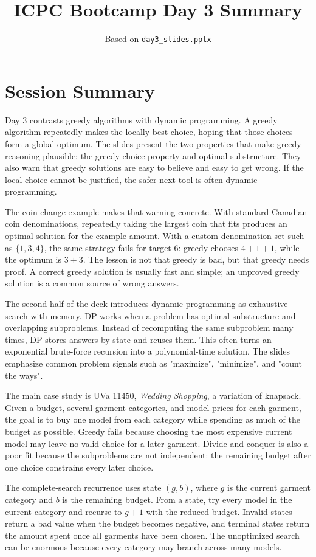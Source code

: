 \documentclass[11pt]{article}
\title{ICPC Bootcamp Day 3 Summary}
\author{Based on \texttt{day3\_slides.pptx}}
\date{}
\begin{document}
\maketitle

\section*{Session Summary}
Day 3 contrasts greedy algorithms with dynamic programming. A greedy algorithm repeatedly makes the locally best choice, hoping that those choices form a global optimum. The slides present the two properties that make greedy reasoning plausible: the greedy-choice property and optimal substructure. They also warn that greedy solutions are easy to believe and easy to get wrong. If the local choice cannot be justified, the safer next tool is often dynamic programming.

The coin change example makes that warning concrete. With standard Canadian coin denominations, repeatedly taking the largest coin that fits produces an optimal solution for the example amount. With a custom denomination set such as \(\{1,3,4\}\), the same strategy fails for target \(6\): greedy chooses \(4+1+1\), while the optimum is \(3+3\). The lesson is not that greedy is bad, but that greedy needs proof. A correct greedy solution is usually fast and simple; an unproved greedy solution is a common source of wrong answers.

The second half of the deck introduces dynamic programming as exhaustive search with memory. DP works when a problem has optimal substructure and overlapping subproblems. Instead of recomputing the same subproblem many times, DP stores answers by state and reuses them. This often turns an exponential brute-force recursion into a polynomial-time solution. The slides emphasize common problem signals such as "maximize", "minimize", and "count the ways".

The main case study is UVa 11450, \textit{Wedding Shopping}, a variation of knapsack. Given a budget, several garment categories, and model prices for each garment, the goal is to buy one model from each category while spending as much of the budget as possible. Greedy fails because choosing the most expensive current model may leave no valid choice for a later garment. Divide and conquer is also a poor fit because the subproblems are not independent: the remaining budget after one choice constrains every later choice.

The complete-search recurrence uses state \((g,b)\), where \(g\) is the current garment category and \(b\) is the remaining budget. From a state, try every model in the current category and recurse to \(g+1\) with the reduced budget. Invalid states return a bad value when the budget becomes negative, and terminal states return the amount spent once all garments have been chosen. The unoptimized search can be enormous because every category may branch across many models.
\end{document}
